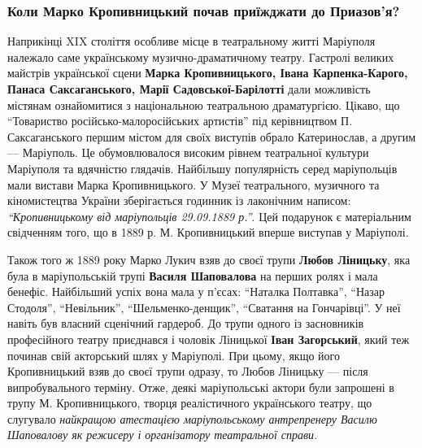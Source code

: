  
 
 
 
 

\subsubsection{Коли Марко Кропивницький почав приїжджати до Приазов'я?}

Наприкінці XIX століття особливе місце в театральному житті Маріуполя належало
саме українському музично-драматичному театру. Гастролі великих майстрів
української сцени \textbf{Марка Кропивницького, Івана Карпенка-Карого, Панаса
Саксаганського, Марії Садовської-Барілотті} дали можливість містянам
ознайомитися з національною театральною драматургією. Цікаво, що \enquote{Товариство
російсько-малоросійських артистів} під керівництвом П. Саксаганського першим
містом для своїх виступів обрало Катеринослав, а другим — Маріуполь. Це
обумовлювалося високим рівнем театральної культури Маріуполя та вдячністю
глядачів. Найбільшу популярність серед маріупольців мали вистави Марка
Кропивницького. У Музеї театрального, музичного та кіномистецтва України
зберігається годинник із лаконічним написом: \emph{\enquote{Кропивницькому від маріупольців
29.09.1889 р.}}. Цей подарунок є матеріальним свідченням того, що в 1889 р. М.
Кропивницький вперше виступав у Маріуполі.




Також того ж 1889 року Марко Лукич взяв до своєї трупи \textbf{Любов Ліницьку}, яка була
в маріупольській трупі \textbf{Василя Шаповалова} на перших ролях і мала бенефіс.
Найбільший успіх вона мала у п'єсах: \enquote{Наталка Полтавка}, \enquote{Назар Стодоля},
\enquote{Невільник}, \enquote{Шельменко-денщик}, \enquote{Сватання на Гончарівці}. У неї навіть був
власний сценічний гардероб. До трупи одного із засновників професійного театру
приєднався і чоловік Ліницької \textbf{Іван Загорський}, який теж починав свій
акторський шлях у Маріуполі. При цьому, якщо його Кропивницький взяв до своєї
трупи одразу, то Любов Ліницьку — після випробувального терміну. Отже, деякі
маріупольські актори були запрошені в трупу М. Кропивницького, творця
реалістичного українського театру, що слугувало \emph{найкращою атестацією
маріупольському антрепренеру Василю Шаповалову як режисеру і організатору
театральної справи.}

